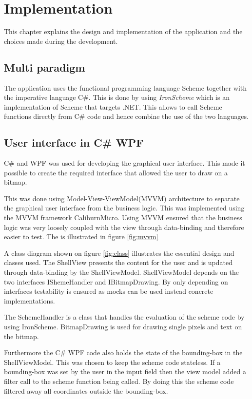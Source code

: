 \chapter{Implementation} 
\label{chp:impl}

This chapter explains the design and implementation of the application and the choices made during the development.

\section{Multi paradigm}
The application uses the functional programming language Scheme together with the imperative language C\#. This is done by using \emph{IronScheme} which is an implementation of Scheme that targets .NET. This allows to call Scheme functions directly from C\# code and hence combine the use of the two languages.

\section{User interface in C\# WPF}
C\# and WPF was used for developing the graphical user interface. This made it possible to create the required interface that allowed the user to draw on a bitmap.

This was done using Model-View-ViewModel(MVVM) architecture to separate the graphical user interface from the business logic. This was implemented using the MVVM framework CaliburnMicro. Using MVVM ensured that the business logic was very loosely coupled with the view through data-binding and therefore easier to test. The is illustrated in figure \ref{fig:mvvm}


A class diagram shown on figure \ref{fig:class} illustrates the essential design and classes used. The ShellView presents the content for the user and is updated through data-binding by the ShellViewModel. ShellViewModel depends on the two interfaces IShemeHandler and IBitmapDrawing. By only depending on interfaces testability is ensured as mocks can be used instead concrete implementations. 

The SchemeHandler is a class that handles the evaluation of the scheme code by using IronScheme. BitmapDrawing is used for drawing single pixels and text on the bitmap.


Furthermore the C\# WPF code also holds the state of the bounding-box in the ShellViewModel. This was chosen to keep the scheme code stateless. If a bounding-box was set by the user in the input field then the view model added a filter call to the scheme function being called. By doing this the scheme code filtered away all coordinates outside the bounding-box.

